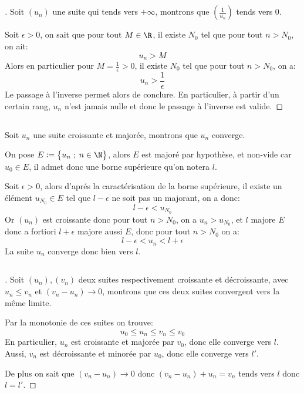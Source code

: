 \documentclass{report}
\begin{document}
   \subsection*{}
   \begin{proof}[\unskip\nopunct]
      Soit \((u_n)\) une suite qui tends vers \(+\infty\), montrons que \((\frac{1}{u_n})\) tends vers \(0\).\<

      Soit \(\epsilon > 0\), on sait que pour tout \(M \in \R\), il existe \(N_0\) tel que pour tout \(n > N_0\), on ait:
      \[
         u_n > M   
      \]
      Alors en particulier pour \(M = \frac{1}{\epsilon} > 0\), il existe \(N_0\) tel que pour tout \(n > N_0\), on a:
      \[
         u_n > \frac{1}{\epsilon}
      \]
      Le passage à l'inverse permet alors de conclure. En particulier, à partir d'un certain rang, \(u_n\) n'est jamais nulle et donc le passage à l'inverse est valide.
   \end{proof}

   \subsection*{}
   Soit \(u_n\) une suite croissante et majorée, montrons que \(u_n\) converge.\<

   On pose \(E := \bigl\{ u_n \; ; \; n \in \N  \bigl\}\), alors \(E\) est majoré par hypothèse, et non-vide car \(u_0 \in E\), il admet donc une borne supérieure qu'on notera \(l\).\<

   Soit \(\epsilon > 0\), alors d'aprés la caractérisation de la borne supérieure, il existe un élément \(u_{N_0} \in E\) tel que \(l - \epsilon\) ne soit pas un majorant, on a donc:
   \[
      l - \epsilon < u_{N_0}
   \]
   Or \((u_n)\) est croissante donc pour tout \(n > N_0\), on a \(u_n > u_{N_0}\), et \(l\) majore \(E\) donc a fortiori \(l + \epsilon\) majore aussi \(E\), donc pour tout \(n > N_0\) on a:
   \[
      l - \epsilon < u_n < l + \epsilon
   \]
   La suite \(u_n\) converge donc bien vers \(l\).
   
   \subsection*{}
   \begin{proof}[\unskip\nopunct]
      Soit \((u_n), (v_n)\) deux suites respectivement croissante et décroissante, avec \(u_n \leq v_n\) et \((v_n - u_n) \rightarrow 0\), montrons que ces deux suites convergent vers la même limite.\<

      Par la monotonie de ces suites on trouve:
      \[
         u_0 \leq u_n \leq v_n \leq v_0   
      \]
      En particulier, \(u_n\) est croissante et majorée par \(v_0\), donc elle converge vers \(l\).
      Aussi, \(v_n\) est décroissante et minorée par \(u_0\), donc elle converge vers \(l'\).\<
   
      De plus on sait que \((v_n - u_n) \rightarrow 0\) donc \((v_n - u_n) + u_n = v_n\) tends vers \(l\) donc \(l = l'\).
   \end{proof}
\end{document}
